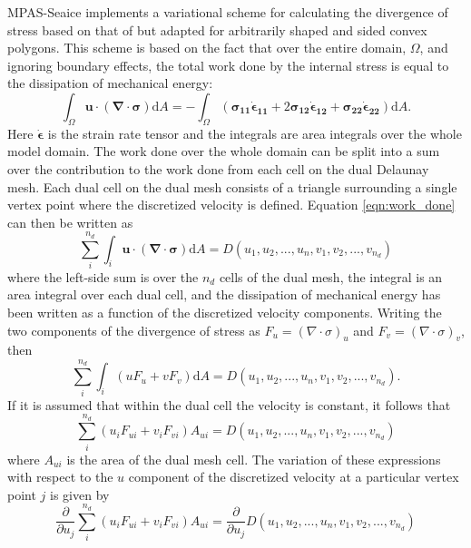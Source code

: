 MPAS-Seaice implements a variational scheme for calculating the divergence of stress based on that of \citet{Hunke02} but adapted for arbitrarily shaped and sided convex polygons. This scheme is based on the fact that over the entire domain, $\Omega$, and ignoring boundary effects, the total work done by the internal stress is equal to the dissipation of mechanical energy:
\begin{equation}
\int_\Omega \boldsymbol{u} \cdot (\boldsymbol{\nabla} \cdot \boldsymbol{\sigma}) \mathrm{d}A = -\int_\Omega (\boldsymbol{\sigma_{11}} \boldsymbol{\dot{\epsilon}_{11}}  + 2 \boldsymbol{\sigma_{12}} \boldsymbol{\dot{\epsilon}_{12}} + \boldsymbol{\sigma_{22}} \boldsymbol{\dot{\epsilon}_{22}}) \mathrm{d}A.
\label{eqn:work_done}
\end{equation}
Here $\boldsymbol{\dot{\epsilon}}$ is the strain rate tensor and the integrals are area integrals over the whole model domain. The work done over the whole domain can be split into a sum over the contribution to the work done from each cell on the dual Delaunay mesh. Each dual cell on the dual mesh consists of a triangle surrounding a single vertex point where the discretized velocity is defined. Equation \ref{eqn:work_done} can then be written as
\begin{equation}
\sum_i^{n_d} \int_i \boldsymbol{u} \cdot (\boldsymbol{\nabla} \cdot \boldsymbol{\sigma}) \mathrm{d}A = D(u_1, u_2, ..., u_n, v_1, v_2, ..., v_{n_d})
\end{equation}
where the left-side sum is over the $n_d$ cells of the dual mesh, the integral is an area integral over each dual cell,  and the dissipation of mechanical energy has been written as a function of the discretized velocity components.
Writing the two components of the divergence of stress as $F_u=(\nabla \cdot \sigma)_u$ and $F_v=(\nabla \cdot \sigma)_v$, then
\begin{equation}
\sum_i^{n_d} \int_i (uF_u + vF_v) \mathrm{d}A = D(u_1, u_2, ..., u_n, v_1, v_2, ..., v_{n_d}).
\end{equation}
If it is assumed that within the dual cell the velocity is constant, it follows that
\begin{equation}
\sum_i^{n_d} (u_i F_{ui} + v_i F_{vi}) A_{ui} = D(u_1, u_2, ..., u_n, v_1, v_2, ..., v_{n_d})
\end{equation}
where $A_{ui}$ is the area of the dual mesh cell.
The variation of these expressions with respect to the $u$ component of the discretized velocity at a particular vertex point $j$ is given by
\begin{equation}
\frac{\partial{}}{\partial{u_j}} \sum_i^{n_d} (u_i F_{ui} + v_i F_{vi}) A_{ui} =  \frac{\partial{}}{\partial{u_j}}D(u_1, u_2, ..., u_n, v_1, v_2, ..., v_{n_d})
\end{equation}
